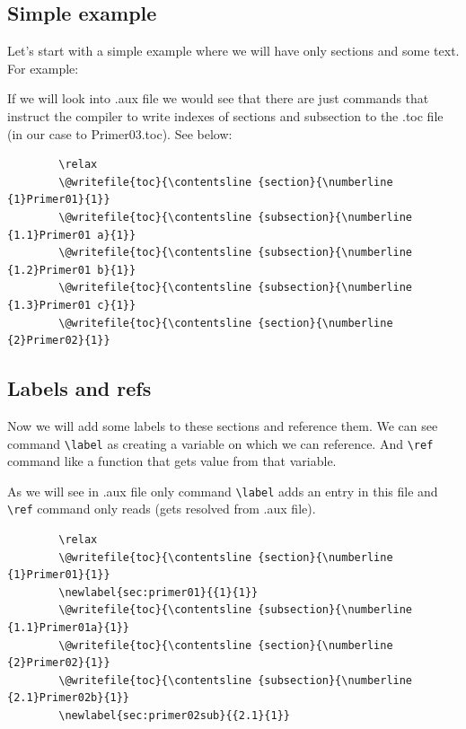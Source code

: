 \documentclass[a4paper,oneside,8pt]{extarticle}
\begin{document}
\subsection{Simple example}
Let's start with a simple example where we will have only sections and some text. For example:\\

\begin{markdown-block}
    
\end{markdown-block}

If we will look into .aux file we would see that there are just commands that instruct the compiler to write indexes of sections and subsection to the .toc file (in our case to Primer03.toc). See below:\\
\begin{markdown-block}
    \begin{verbatim}
        \relax 
        \@writefile{toc}{\contentsline {section}{\numberline {1}Primer01}{1}}
        \@writefile{toc}{\contentsline {subsection}{\numberline {1.1}Primer01 a}{1}}
        \@writefile{toc}{\contentsline {subsection}{\numberline {1.2}Primer01 b}{1}}
        \@writefile{toc}{\contentsline {subsection}{\numberline {1.3}Primer01 c}{1}}
        \@writefile{toc}{\contentsline {section}{\numberline {2}Primer02}{1}}
    \end{verbatim}
\end{markdown-block}

\subsection{Labels and refs}
Now we will add some labels to these sections and reference them. We can see command \verb|\label| as creating a variable on which we can reference. And \verb|\ref| command like a function that gets value from that variable. 
\begin{markdown-block}
    
\end{markdown-block}

As we will see in .aux file only command \verb|\label| adds an entry in this file and \verb|\ref| command only reads (gets resolved from .aux file).\\
\begin{markdown-block}
    \begin{verbatim}
        \relax 
        \@writefile{toc}{\contentsline {section}{\numberline {1}Primer01}{1}}
        \newlabel{sec:primer01}{{1}{1}}
        \@writefile{toc}{\contentsline {subsection}{\numberline {1.1}Primer01a}{1}}
        \@writefile{toc}{\contentsline {section}{\numberline {2}Primer02}{1}}
        \@writefile{toc}{\contentsline {subsection}{\numberline {2.1}Primer02b}{1}}
        \newlabel{sec:primer02sub}{{2.1}{1}}
    \end{verbatim}
\end{markdown-block}
\end{document}
